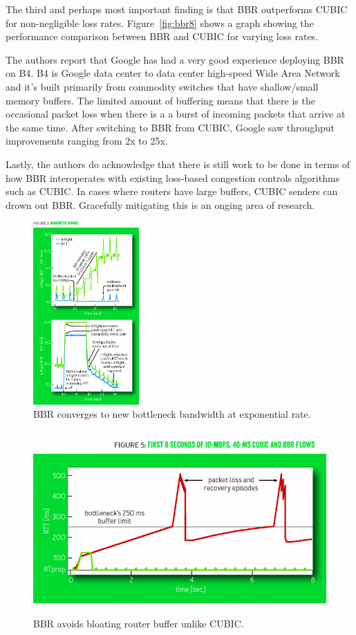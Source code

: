 The third and perhaps most important finding is that BBR outperforms CUBIC for non-negligible loss rates.
Figure~\ref{fig:bbr8} shows a graph showing the performance comparison between BBR and CUBIC
for varying loss rates.

The authors report that Google has had a very good experience deploying BBR on B4. B4 is Google  data center to
data center high-speed Wide Area Network and it's built primarily from commodity switches that have shallow/small
memory buffers. The limited amount of buffering means that there is the occasional packet loss when there is a
a burst of incoming packets that arrive at the same time. After switching to BBR from CUBIC, Google saw throughput
improvements ranging from 2x to 25x.

Lastly, the authors do acknowledge that there is still work to be done in terms of how BBR interoperates
with existing loss-based congestion controls algorithms such as CUBIC. In cases where routers have large buffers,
CUBIC senders can drown out BBR. Gracefully mitigating this is an onging area of research.



\begin{figure}[h]
  \centering
  \includegraphics[height=7cm]{./img/bbr_fig3.png}
  \caption{BBR converges to new bottleneck bandwidth at exponential rate.}
  \label{fig:bbr3}
\end{figure}


\begin{figure}[h]
  \centering
  \includegraphics[height=7cm]{./img/bbr_fig5.png}
  \caption{BBR avoids bloating router buffer unlike CUBIC.}
  \label{fig:bbr5}
\end{figure}



